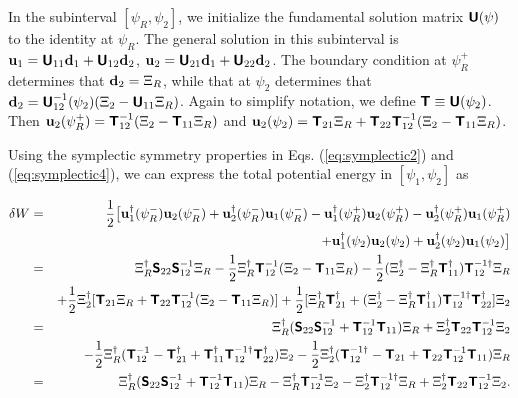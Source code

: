 \documentclass[prb,twocolumn,showpacs,preprintnumbers,amsmath,amssymb]{revtex4}
\renewcommand*{\v}[1]{\hbox{\bfseries #1}}
\renewcommand*{\t}[1]{\hbox{\sffamily\bfseries #1}}
\begin{document}
In the subinterval $[\psi_R,\psi_2]$, we initialize the fundamental
solution matrix $\t{U}(\psi)$ to the identity at $\psi_R$.  The general
solution in this subinterval is $\v{u}_1 = \t{U}_{11} \v{d}_1 +
\t{U}_{12} \v{d}_2$, $\v{u}_2 = \t{U}_{21} \v{d}_1 + \t{U}_{22}
\v{d}_2$.  The boundary condition at $\psi_R^+$ determines that $\v{d}_2
= \Xi_R$, while that at $\psi_2$ determines that $\v{d}_2 =
\t{U}_{12}^{-1}(\psi_2)(\Xi_2 - \t{U}_{11} \Xi_R)$.  Again to simplify
notation, we define $\t{T} \equiv \t{U}(\psi_2)$.  Then
$\v{u}_2(\psi_R^+) = \t{T}_{12}^{-1} (\Xi_2 - \t{T}_{11} \Xi_R)$ and
$\v{u}_2(\psi_2) = \t{T}_{21}\Xi_R + \t{T}_{22} \t{T}_{12}^{-1}(\Xi_2 -
\t{T}_{11}\Xi_R)$.

Using the symplectic symmetry properties in Eqs. (\ref{eq:symplectic2})
and (\ref{eq:symplectic4}), we can express the total potential energy in
$[\psi_1,\psi_2]$ as
\begin{widetext}
\begin{eqnarray}
\delta W 
=&& \frac{1}{2} \big[ \v{u}_1^\dagger(\psi_R^-) \v{u}_2(\psi_R^-) 
	+ \v{u}_2^\dagger(\psi_R^-) \v{u}_1(\psi_R^-)
	- \v{u}_1^\dagger(\psi_R^+) \v{u}_2(\psi_R^+) 
	- \v{u}_2^\dagger(\psi_R^+) \v{u}_1(\psi_R^+) \nonumber \\
&& + \v{u}_1^\dagger(\psi_2) \v{u}_2(\psi_2) 
	+ \v{u}_2^\dagger(\psi_2) \v{u}_1(\psi_2) \big] \nonumber \\
=&& \Xi_R^\dagger \t{S}_{22} \t{S}_{12}^{-1} \Xi_R
	- \frac{1}{2} \Xi_R^\dagger \t{T}_{12}^{-1}
	(\Xi_2 - \t{T}_{11} \Xi_R)
	- \frac{1}{2} 
	(\Xi_2^\dagger - \Xi_R^\dagger \t{T}_{11}^\dagger )
	\t{T}_{12}^{-1\dagger} \Xi_R \nonumber \\
&& + \frac{1}{2} \Xi_2^\dagger [ \t{T}_{21} \Xi_R
	+ \t{T}_{22} \t{T}_{12}^{-1}
	(\Xi_2 - \t{T}_{11} \Xi_R) ]
	+ \frac{1}{2} [ \Xi_R^\dagger \t{T}_{21}^\dagger
	+ (\Xi_2^\dagger - \Xi_R^\dagger \t{T}_{11}^\dagger)
	\t{T}_{12}^{-1\dagger} \t{T}_{22}^\dagger ] \Xi_2 \nonumber \\
=&& \Xi_R^\dagger ( \t{S}_{22} \t{S}_{12}^{-1}
	+ \t{T}_{12}^{-1} \t{T}_{11} ) \Xi_R
	+ \Xi_2^\dagger \t{T}_{22} \t{T}_{12}^{-1} \Xi_2 \nonumber \\
&& - \frac{1}{2} \Xi_R^\dagger (
	\t{T}_{12}^{-1} - \t{T}_{21}^\dagger
	+ \t{T}_{11}^\dagger \t{T}_{12}^{-1\dagger} \t{T}_{22}^\dagger
	) \Xi_2
	- \frac{1}{2} \Xi_2^\dagger (
	\t{T}_{12}^{-1\dagger} - \t{T}_{21}
	+ \t{T}_{22} \t{T}_{12}^{-1} \t{T}_{11}
	) \Xi_R \nonumber \\
=&& \Xi_R^\dagger (\t{S}_{22} \t{S}_{12}^{-1}
	+ \t{T}_{12}^{-1} \t{T}_{11} ) \Xi_R
	- \Xi_R^\dagger \t{T}_{12}^{-1} \Xi_2
	- \Xi_2^\dagger \t{T}_{12}^{-1\dagger} \Xi_R
	+ \Xi_2^\dagger \t{T}_{22} \t{T}_{12}^{-1} \Xi_2.
\end{eqnarray}
\end{widetext}
\end{document}
